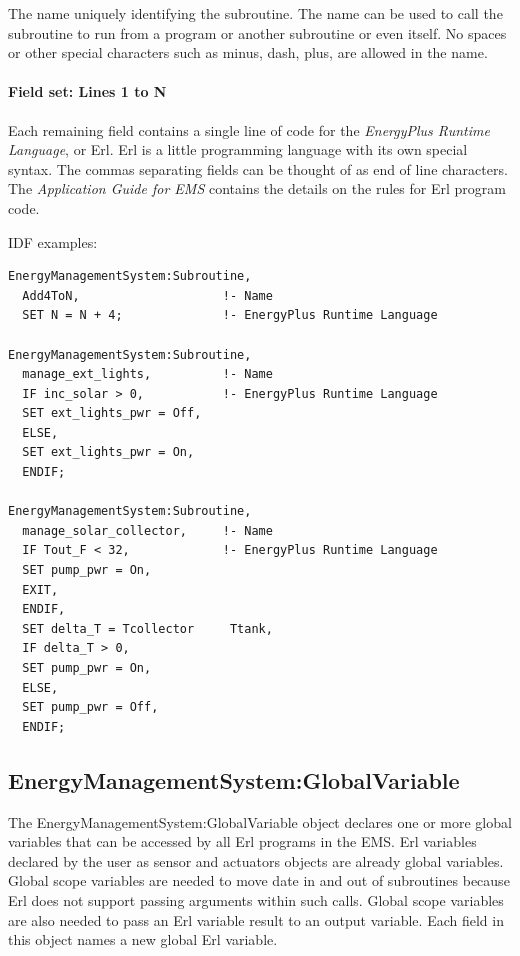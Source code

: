 The name uniquely identifying the subroutine. The name can be used to call the subroutine to run from a program or another subroutine or even itself. No spaces or other special characters such as minus, dash, plus, are allowed in the name.

\paragraph{Field set: Lines 1 to N}\label{field-set-lines-1-to-n}

Each remaining field contains a single line of code for the \emph{EnergyPlus Runtime Language}, or Erl. Erl is a little programming language with its own special syntax. The commas separating fields can be thought of as end of line characters. The \emph{Application Guide for EMS} contains the details on the rules for Erl program code.

IDF examples:

\begin{lstlisting}
EnergyManagementSystem:Subroutine,
  Add4ToN,                    !- Name
  SET N = N + 4;              !- EnergyPlus Runtime Language

EnergyManagementSystem:Subroutine,
  manage_ext_lights,          !- Name
  IF inc_solar > 0,           !- EnergyPlus Runtime Language
  SET ext_lights_pwr = Off,
  ELSE,
  SET ext_lights_pwr = On,
  ENDIF;

EnergyManagementSystem:Subroutine,
  manage_solar_collector,     !- Name
  IF Tout_F < 32,             !- EnergyPlus Runtime Language
  SET pump_pwr = On,
  EXIT,
  ENDIF,
  SET delta_T = Tcollector     Ttank,
  IF delta_T > 0,
  SET pump_pwr = On,
  ELSE,
  SET pump_pwr = Off,
  ENDIF;
\end{lstlisting}

\subsection{EnergyManagementSystem:GlobalVariable}\label{energymanagementsystemglobalvariable}

The EnergyManagementSystem:GlobalVariable object declares one or more global variables that can be accessed by all Erl programs in the EMS. Erl variables declared by the user as sensor and actuators objects are already global variables. Global scope variables are needed to move date in and out of subroutines because Erl does not support passing arguments within such calls. Global scope variables are also needed to pass an Erl variable result to an output variable. Each field in this object names a new global Erl variable.

